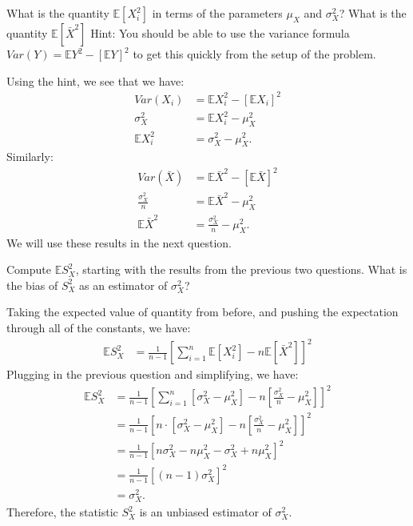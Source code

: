 
What is the quantity $\mathbb{E}[X_i^2]$ in terms of the parameters $\mu_X$ and
$\sigma_X^2$? What is the quantity $\mathbb{E}[\bar{X}^2]$ Hint: You should be
able to use the variance formula $Var(Y) = \mathbb{E}Y^2 - [\mathbb{E}Y]^2$
to get this quickly from the setup of the problem.


Using the hint, we see that we have:
\begin{align*}
Var(X_i) &= \mathbb{E}X_i^2 - [\mathbb{E}X_i]^2 \\
\sigma_X^2 &= \mathbb{E}X_i^2 - \mu_X^2 \\
\mathbb{E}X_i^2 &= \sigma_X^2 - \mu_X^2.
\end{align*}
Similarly:
\begin{align*}
Var(\bar{X}) &= \mathbb{E}\bar{X}^2 - [\mathbb{E}\bar{X}]^2 \\
\frac{\sigma_X^2}{n}  &= \mathbb{E}\bar{X}^2 - \mu_X^2 \\
\mathbb{E}\bar{X}^2 &= \frac{\sigma_X^2}{n} - \mu_X^2.
\end{align*}
We will use these results in the next question.


Compute $\mathbb{E}S_X^2$, starting with the results from the previous two
questions. What is the bias of $S_X^2$ as an estimator of $\sigma_X^2$?


Taking the expected value of quantity from before, and pushing the expectation
through all of the constants, we have:
\begin{align*}
\mathbb{E} S^2_X &= \frac{1}{n-1} \left[ \sum_{i=1}^n \mathbb{E} [X_i^2] - n \mathbb{E}[\bar{X}^2] \right]^2
\end{align*}
Plugging in the previous question and simplifying, we have:
\begin{align*}
\mathbb{E} S^2_X &= \frac{1}{n-1} \left[ \sum_{i=1}^n \left[ \sigma_X^2 - \mu_X^2 \right] -
  n \left[ \frac{\sigma_X^2}{n} - \mu_X^2 \right] \right]^2 \\
&= \frac{1}{n-1} \left[ n \cdot \left[ \sigma_X^2 - \mu_X^2 \right] -
  n \left[ \frac{\sigma_X^2}{n} - \mu_X^2 \right] \right]^2 \\
&= \frac{1}{n-1} \left[ n \sigma_X^2 - n \mu_X^2 - \sigma_X^2 + n \mu_X^2  \right]^2 \\
&= \frac{1}{n-1} \left[ (n-1) \sigma_X^2 \right]^2 \\
&= \sigma_X^2.
\end{align*}
Therefore, the statistic $S_X^2$ is an unbiased estimator of $\sigma_X^2$.

